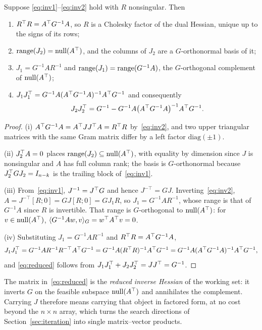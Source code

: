 \begin{proposition}\label{prop:blocks}
Suppose \eqref{eq:inv1}--\eqref{eq:inv2} hold with $R$ nonsingular. Then
\begin{enumerate}
  \item[(i)] $R^{\top} R = A^{\top} G^{-1} A$, so $R$ is a Cholesky factor of the dual Hessian,
        unique up to the signs of its rows;
  \item[(ii)] $\operatorname{range}(J_2) = \operatorname{null}(A^{\top})$, and the columns of $J_2$ are a
        $G$-orthonormal basis of it;
  \item[(iii)] $J_1 = G^{-1} A R^{-1}$ and $\operatorname{range}(J_1) = \operatorname{range}(G^{-1}A)$, the
        $G$-orthogonal complement of $\operatorname{null}(A^{\top})$;
  \item[(iv)] $J_1 J_1^{\top} = G^{-1}A(A^{\top} G^{-1}A)^{-1}A^{\top} G^{-1}$ and consequently
        \begin{equation}
          J_2 J_2^{\top} = G^{-1} - G^{-1}A\bigl(A^{\top} G^{-1}A\bigr)^{-1}A^{\top} G^{-1}.
          \label{eq:reduced}
        \end{equation}
\end{enumerate}
\end{proposition}

\begin{proof}
(i) $A^{\top} G^{-1} A = A^{\top} J J^{\top} A = R^{\top} R$ by~\eqref{eq:inv2}, and two upper
triangular matrices with the same Gram matrix differ by a left factor
$\mathrm{diag}(\pm1)$.

(ii) $J_2^{\top} A = 0$ places $\operatorname{range}(J_2) \subseteq \operatorname{null}(A^{\top})$, with equality by
dimension since $J$ is nonsingular and $A$ has full column rank; the basis is
$G$-orthonormal because $J_2^{\top} G J_2 = I_{n-k}$ is the trailing block
of~\eqref{eq:inv1}.

(iii) From~\eqref{eq:inv1}, $J^{-1} = J^{\top} G$ and hence $J^{-\top} = G J$.
Inverting~\eqref{eq:inv2}, $A = J^{-\top}[R;0] = GJ[R;0] = G J_1 R$, so
$J_1 = G^{-1}AR^{-1}$, whose range is that of $G^{-1}A$ since $R$ is invertible.
That range is $G$-orthogonal to $\operatorname{null}(A^{\top})$: for $v \in \operatorname{null}(A^{\top})$,
$\langle G^{-1}Aw, v\rangle_G = w^{\top} A^{\top} v = 0$.

(iv) Substituting $J_1 = G^{-1}AR^{-1}$ and $R^{\top} R = A^{\top} G^{-1}A$,
\[
  J_1 J_1^{\top} = G^{-1}A R^{-1} R^{-\top} A^{\top} G^{-1}
            = G^{-1}A (R^{\top} R)^{-1} A^{\top} G^{-1}
            = G^{-1}A (A^{\top} G^{-1}A)^{-1} A^{\top} G^{-1},
\]
and \eqref{eq:reduced} follows from $J_1J_1^{\top} + J_2J_2^{\top} = JJ^{\top} = G^{-1}$.
\end{proof}

The matrix in~\eqref{eq:reduced} is the \emph{reduced inverse Hessian} of the
working set: it inverts $G$ on the feasible subspace $\operatorname{null}(A^{\top})$ and
annihilates the complement. Carrying $J$ therefore means carrying that object in
factored form, at no cost beyond the $n \times n$ array, which turns the search
directions of Section~\ref{sec:iteration} into single matrix--vector products.

